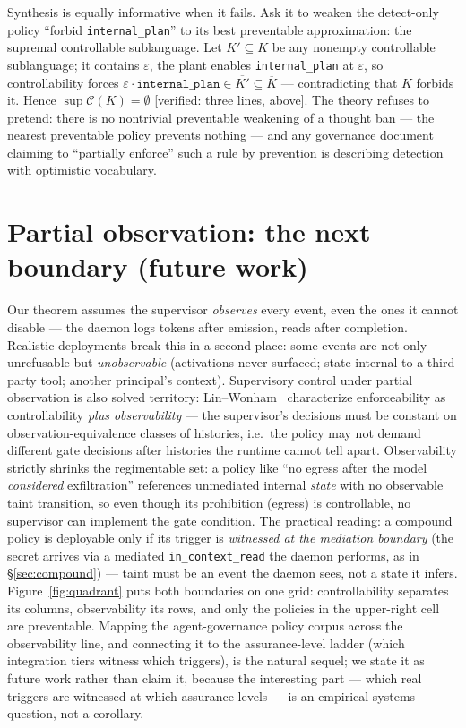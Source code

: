 \documentclass[11pt,a4paper]{article}  \usepackage{mdframed} \usepackage{graphicx}
\begin{document}
Synthesis is equally informative when it fails. Ask it to weaken the detect-only policy ``forbid \texttt{internal\_plan}'' to
its best preventable approximation: the supremal controllable sublanguage. Let $K'\subseteq K$ be any nonempty controllable
sublanguage; it contains $\varepsilon$, the plant enables \texttt{internal\_plan} at $\varepsilon$, so controllability forces
$\varepsilon\cdot\texttt{internal\_plan}\in\overline{K'}\subseteq\overline{K}$ --- contradicting that $K$ forbids it. Hence
$\sup\mathcal{C}(K)=\emptyset$ [verified: three lines, above]. The theory refuses to pretend: there is no nontrivial
preventable weakening of a thought ban --- the nearest preventable policy prevents nothing --- and any governance document
claiming to ``partially enforce'' such a rule by prevention is describing detection with optimistic vocabulary.

\section{Partial observation: the next boundary (future work)}\label{sec:partial} Our theorem assumes the supervisor
\emph{observes} every event, even the ones it cannot disable --- the daemon logs tokens after emission, reads after
completion. Realistic deployments break this in a second place: some events are not only unrefusable but \emph{unobservable}
(activations never surfaced; state internal to a third-party tool; another principal's context). Supervisory control under
partial observation is also solved territory: Lin--Wonham~\cite{lw88} characterize enforceability as controllability
\emph{plus observability} --- the supervisor's decisions must be constant on observation-equivalence classes of histories,
i.e.\ the policy may not demand different gate decisions after histories the runtime cannot tell apart. Observability
strictly shrinks the regimentable set: a policy like ``no egress after the model \emph{considered} exfiltration'' references
unmediated internal \emph{state} with no observable taint transition, so even though its prohibition (egress) is
controllable, no supervisor can implement the gate condition. The practical reading: a compound policy is deployable only if
its trigger is \emph{witnessed at the mediation boundary} (the secret arrives via a mediated \texttt{in\_context\_read} the
daemon performs, as in \S\ref{sec:compound}) --- taint must be an event the daemon sees, not a state it infers.
Figure~\ref{fig:quadrant} puts both boundaries on one grid: controllability separates its columns, observability its rows,
and only the policies in the upper-right cell are preventable. Mapping the
agent-governance policy corpus across the observability line, and connecting it to the assurance-level ladder (which
integration tiers witness which triggers), is the natural sequel; we state it as future work rather than claim it, because
the interesting part --- which real triggers are witnessed at which assurance levels --- is an empirical systems question,
not a corollary.
\end{document}
